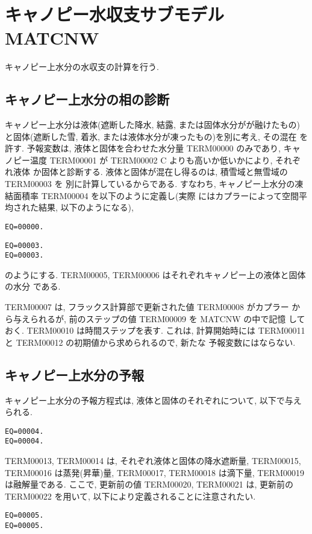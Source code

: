 
\section{キャノピー水収支サブモデル MATCNW}

キャノピー上水分の水収支の計算を行う.

\subsection{キャノピー上水分の相の診断}

キャノピー上水分は液体(遮断した降水, 結露, または固体水分がが融けたもの)
と固体(遮断した雪, 着氷, または液体水分が凍ったもの)を別に考え, その混在
を許す.
予報変数は, 液体と固体を合わせた水分量 TERM00000 のみであり, キャノピー温度
TERM00001 が TERM00002 C よりも高いか低いかにより, それぞれ液体
か固体と診断する. 液体と固体が混在し得るのは, 積雪域と無雪域の TERM00003 を
別に計算しているからである.
すなわち, キャノピー上水分の凍結面積率 TERM00004 を以下のように定義し(実際
にはカプラーによって空間平均された結果, 以下のようになる),
\begin{verbatim}
EQ=00000.
\end{verbatim}
\begin{verbatim}
EQ=00003.
EQ=00003.
\end{verbatim}
のようにする. TERM00005, TERM00006 はそれぞれキャノピー上の液体と固体の水分
である.

TERM00007 は, フラックス計算部で更新された値 TERM00008 がカプラー
から与えられるが, 前のステップの値 TERM00009 を MATCNW の中で記憶
しておく. TERM00010 は時間ステップを表す.
これは, 計算開始時には TERM00011 と TERM00012 の初期値から求められるので, 新たな
予報変数にはならない.

\subsection{キャノピー上水分の予報}

キャノピー上水分の予報方程式は, 液体と固体のそれぞれについて, 以下で与え
られる.
\begin{verbatim}
EQ=00004.
EQ=00004.
\end{verbatim}
TERM00013, TERM00014 は, それぞれ液体と固体の降水遮断量,
TERM00015, TERM00016 は蒸発(昇華)量,
TERM00017, TERM00018 は滴下量,
TERM00019 は融解量である.
ここで, 更新前の値 TERM00020, TERM00021 は, 更新前の
TERM00022 を用いて, 以下により定義されることに注意されたい.
\begin{verbatim}
EQ=00005.
EQ=00005.
\end{verbatim}

